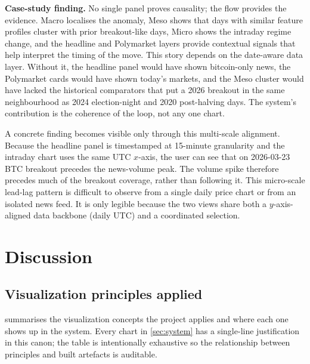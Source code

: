 \documentclass[journal,hideappendix]{vgtc}      %
\begin{document}
\textbf{Case-study finding.}  
No single panel proves causality; the flow provides the evidence.  
Macro localises the anomaly, Meso shows that days with similar feature profiles cluster with prior breakout-like days, Micro shows the intraday regime change, and the headline and Polymarket layers provide contextual signals that help interpret the timing of the move. 
This story depends on the date-aware data layer. Without it, the headline panel would have shown bitcoin-only news, the Polymarket cards would have shown today's markets, and the Meso cluster would have lacked the historical comparators that put a 2026 breakout in the same neighbourhood as 2024 election-night and 2020 post-halving days.  The system's contribution is the coherence of the loop, not any one chart.

A concrete finding becomes visible only through this multi-scale alignment.  
Because the headline panel is timestamped at 15-minute granularity and the intraday chart uses the same UTC \(x\)-axis, the user can see that on 2026-03-23 BTC breakout precedes the news-volume peak.
The volume spike therefore precedes much of the breakout coverage, rather than following it.  
This micro-scale lead-lag pattern is difficult to observe from a single daily price chart or from an isolated news feed.  
It is only legible because the two views share both a $y$-axis-aligned data backbone (daily UTC) and a coordinated selection.



\section{Discussion}
\label{sec:discussion}

\subsection{Visualization principles applied}
\label{sec:knowledge}

 summarises the visualization concepts the
project applies and where each one shows up in the system.  Every
chart in \cref{sec:system} has a single-line justification in this
canon; the table is intentionally exhaustive so the relationship
between principles and built artefacts is auditable.
\end{document}

